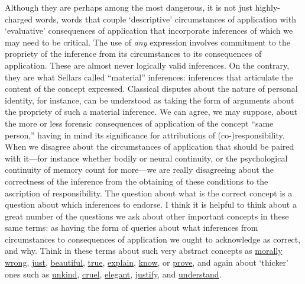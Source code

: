 Although they are perhaps among the most dangerous, it is not just
highly-charged words, words that couple `descriptive' circumstances of
application with `evaluative' consequences of application that
incorporate inferences of which we may need to be critical. The use of
\emph{any} expression involves commitment to the propriety of the
inference from its circumstances to its consequences of application.
These are almost never logically valid inferences. On the contrary, they
are what Sellars called ``material'' inferences: inferences that
articulate the content of the concept expressed. Classical disputes
about the nature of personal identity, for instance, can be understood
as taking the form of arguments about the propriety of such a material
inference. We can agree, we may suppose, about the more or less forensic
consequences of application of the concept ``same person,'' having in
mind its significance for attributions of (co-)responsibility. When we
disagree about the circumstances of application that should be paired
with it---for instance whether bodily or neural continuity, or the
psychological continuity of memory count for more---we are really
disagreeing about the correctness of the inference from the obtaining of
these conditions to the ascription of responsibility. The question about
what is the correct concept is a question about which inferences to
endorse. I think it is helpful to think about a great number of the
questions we ask about other important concepts in these same terms: as
having the form of queries about what inferences from circumstances to
consequences of application we ought to acknowledge as correct, and why.
Think in these terms about such very abstract concepts as
\underline{morally wrong}, \underline{just}, \underline{beautiful},
\underline{true}, \underline{explain}, \underline{know}, or
\underline{prove}, and again about `thicker' ones such as
\underline{unkind}, \underline{cruel}, \underline{elegant},
\underline{justify}, and \underline{understand}.

